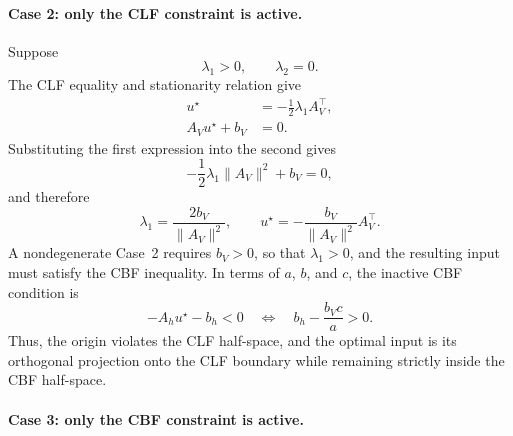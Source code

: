 \documentclass[../../master-handout.tex]{subfiles}
\begin{document}
\paragraph{Case 2: only the CLF constraint is active.}

Suppose
\begin{equation}
    \lambda_1>0,
    \qquad
    \lambda_2=0.
\end{equation}
The CLF equality and stationarity relation give
\begin{align}
    u^\star&=-\frac{1}{2}\lambda_1A_V^\top,
    \\
    A_Vu^\star+b_V&=0.
\end{align}
Substituting the first expression into the second gives
\begin{equation}
    -\frac{1}{2}\lambda_1\|A_V\|^2+b_V=0,
\end{equation}
and therefore
\begin{equation}
    \lambda_1
    =
    \frac{2b_V}{\|A_V\|^2},
    \qquad
    u^\star
    =
    -\frac{b_V}{\|A_V\|^2}A_V^\top.
    \label{eq:lec23-case2}
\end{equation}
A nondegenerate Case~2 requires $b_V>0$, so that $\lambda_1>0$, and the resulting input must satisfy the CBF inequality. In terms of $a$, $b$, and $c$, the inactive CBF condition is
\begin{equation}
    -A_hu^\star-b_h<0
    \quad\Longleftrightarrow\quad
    b_h-\frac{b_Vc}{a}>0.
    \label{eq:lec23-case2-inactive}
\end{equation}
Thus, the origin violates the CLF half-space, and the optimal input is its orthogonal projection onto the CLF boundary while remaining strictly inside the CBF half-space.

\paragraph{Case 3: only the CBF constraint is active.}
\end{document}
